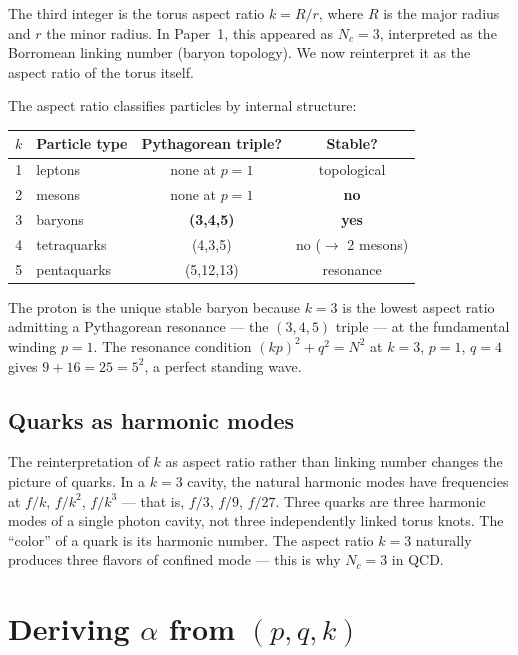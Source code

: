 \documentclass[11pt,a4paper]{article}
\begin{document}
The third integer is the torus aspect ratio $k = R/r$, where $R$ is the major radius and $r$ the minor radius. In Paper~1, this appeared as $N_c = 3$, interpreted as the Borromean linking number (baryon topology). We now reinterpret it as the aspect ratio of the torus itself.

The aspect ratio classifies particles by internal structure:

\begin{table}[h]
\centering
\begin{tabular}{@{}clcc@{}}
\toprule
$k$ & Particle type & Pythagorean triple? & Stable? \\
\midrule
1 & leptons & none at $p=1$ & topological \\
2 & mesons & none at $p=1$ & \textbf{no} \\
3 & baryons & \textbf{(3,4,5)} & \textbf{yes} \\
4 & tetraquarks & (4,3,5) & no ($\to$ 2 mesons) \\
5 & pentaquarks & (5,12,13) & resonance \\
\bottomrule
\end{tabular}
\end{table}

The proton is the unique stable baryon because $k=3$ is the lowest aspect ratio admitting a Pythagorean resonance --- the $(3,4,5)$ triple --- at the fundamental winding $p=1$. The resonance condition $(kp)^2 + q^2 = N^2$ at $k=3$, $p=1$, $q=4$ gives $9 + 16 = 25 = 5^2$, a perfect standing wave.

\subsection{Quarks as harmonic modes}

The reinterpretation of $k$ as aspect ratio rather than linking number changes the picture of quarks. In a $k=3$ cavity, the natural harmonic modes have frequencies at $f/k$, $f/k^2$, $f/k^3$ --- that is, $f/3$, $f/9$, $f/27$. Three quarks are three harmonic modes of a single photon cavity, not three independently linked torus knots. The ``color'' of a quark is its harmonic number. The aspect ratio $k=3$ naturally produces three flavors of confined mode --- this is why $N_c = 3$ in QCD.

\section{Deriving $\alpha$ from $(p, q, k)$}
\label{sec:alpha}
\end{document}
